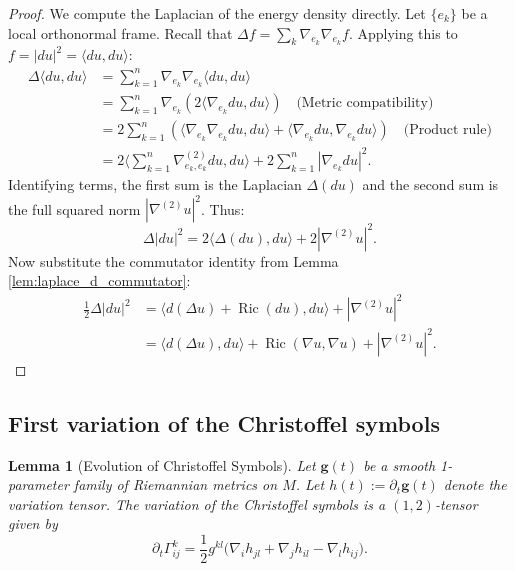 \documentclass[11pt]{article}
\theoremstyle{plain}
\newtheorem{lemma}[theorem]{Lemma}
\theoremstyle{definition}
\theoremstyle{remark}
\begin{document}
\begin{proof}
    We compute the Laplacian of the energy density directly. Let $\{e_k\}$ be a local orthonormal frame.
    Recall that $\Delta f = \sum_k \nabla_{e_k} \nabla_{e_k} f$. Applying this to $f = |du|^2 = \langle du, du \rangle$:
    \begin{align*}
        \Delta \langle du, du \rangle 
        &= \sum_{k=1}^n \nabla_{e_k} \nabla_{e_k} \langle du, du \rangle \\
        &= \sum_{k=1}^n \nabla_{e_k} \left( 2 \langle \nabla_{e_k} du, du \rangle \right) \quad \text{(Metric compatibility)} \\
        &= 2 \sum_{k=1}^n \left( \langle \nabla_{e_k} \nabla_{e_k} du, du \rangle + \langle \nabla_{e_k} du, \nabla_{e_k} du \rangle \right) \quad \text{(Product rule)} \\
        &= 2 \Big\langle \sum_{k=1}^n \nabla^{(2)}_{e_k, e_k} du, du \Big\rangle + 2 \sum_{k=1}^n |\nabla_{e_k} du|^2.
    \end{align*}
    Identifying terms, the first sum is the Laplacian $\Delta(du)$ and the second sum is the full squared norm $|\nabla^{(2)} u|^2$. Thus:
    \begin{equation*}
        \Delta |du|^2 = 2 \langle \Delta(du), du \rangle + 2 |\nabla^{(2)} u|^2.
    \end{equation*}
    Now substitute the commutator identity from Lemma \ref{lem:laplace_d_commutator}:
    \begin{align*}
        \frac{1}{2} \Delta |du|^2 &= \langle d(\Delta u) + \operatorname{Ric}(du), du \rangle + |\nabla^{(2)} u|^2 \\
        &= \langle d(\Delta u), du \rangle + \operatorname{Ric}(\nabla u, \nabla u) + |\nabla^{(2)} u|^2.
    \end{align*}
\end{proof}

\subsection{First variation of the Christoffel symbols}\label{subsec:1stVarFormulaChristoffel}

\begin{lemma}[Evolution of Christoffel Symbols]
\label{lem:christoffel_evolution}
    Let $\mathbf{g}(t)$ be a smooth 1-parameter family of Riemannian metrics on $M$. Let $h(t) := \partial_t \mathbf{g}(t)$ denote the variation tensor.
    The variation of the Christoffel symbols is a $(1,2)$-tensor given by
    \begin{equation}
        \partial_t \Gamma_{ij}^k = \frac{1}{2} g^{kl} \big( \nabla_i h_{jl} + \nabla_j h_{il} - \nabla_l h_{ij} \big).
    \end{equation}
\end{lemma}
\end{document}
